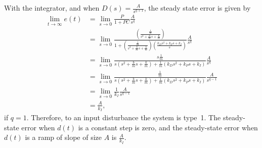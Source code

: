 With the integrator, and when $D(s)= \frac{A}{s^{q+1}}$, the steady state error is given by
\begin{align*}
\lim_{t\to\infty} e(t) &= \lim_{s\to 0} \frac{P}{1+PC}\frac{A}{s^q} \\
&= \lim_{s\to 0} \frac{\left(\frac{\frac{1}{m}}{s^2+\frac{b}{m}s+\frac{k}{m}}\right)}{1+\left(\frac{\frac{1}{m}}{s^2+\frac{b}{m}s+\frac{k}{m}}\right)\left(\frac{k_Ds^2+k_Ps+k_I}{s}\right)}\frac{A}{s^q} \\
&= \lim_{s\to 0} \frac{s\frac{1}{m}}{s\left(s^2+\frac{b}{m}s+\frac{k}{m}\right)+\frac{1}{m}\left(k_Ds^2+k_Ps+k_I\right)}\frac{A}{s^q} \\
&= \lim_{s\to 0} \frac{\frac{1}{m}}{s\left(s^2+\frac{b}{m}s+\frac{k}{m}\right)+\frac{1}{m}\left(k_Ds^2+k_Ps+k_I\right)}\frac{A}{s^{q-1}} \\
&= \lim_{s\to 0} \frac{1}{k_I}\frac{A}{s^{q-1}} \\
&= \frac{A}{k_I},
\end{align*}
if $q=1$.  Therefore, to an input disturbance the system is type~1.  The steady-state error when $d(t)$ is a constant step is zero, and the steady-state error when $d(t)$ is a ramp of slope of size $A$ is $\frac{A}{k_I}$.  

